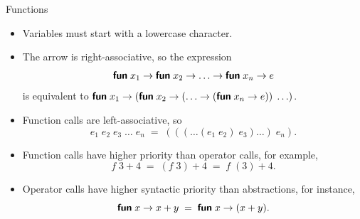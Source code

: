 \documentclass[compress,dvipdfmx]{beamer}
\begin{document}
%
\begin{frame}{Functions}

  \begin{itemize}

    \item Variables must start with a lowercase character.

    \item The arrow is right-associative, so the expression
      \begin{equation*}
        \textsf{\textbf{fun}} \; x_1 \rightarrow \textsf{\textbf{fun}} \; x_2
        \rightarrow \ldots
        \rightarrow \textsf{\textbf{fun}} \; x_n \rightarrow e
      \end{equation*}
      is equivalent to \(\textsf{\textbf{fun}} \; x_1 \rightarrow (\textsf{\textbf{fun}}
      \; x_2 \rightarrow (\ldots \rightarrow
      (\textsf{\textbf{fun}} \; x_n \rightarrow e)) \; \ldots)\).

    \item Function calls are left\hyp{}associative, so
      \begin{equation*}
        e_1 \; e_2 \; e_3 \; \ldots \; e_n \;=\; (((\ldots
        (e_1 \; e_2) \; e_3) \ldots) \; e_n).
      \end{equation*}

    \item Function calls have higher priority than operator calls, for
      example,
      \begin{equation*}
        f \; 3 + 4 \; = \; (f \; 3) + 4 \; = \; f\;(3) + 4.
      \end{equation*}

    \item Operator calls have higher syntactic priority than
      abstractions, for instance,
      \begin{equation*}
        \textsf{\textbf{fun}} \; x \rightarrow x + y \;=\;
        \textsf{\textbf{fun}} \; x \rightarrow (x + y).
      \end{equation*}

\end{itemize}

\end{frame}
\end{document}
